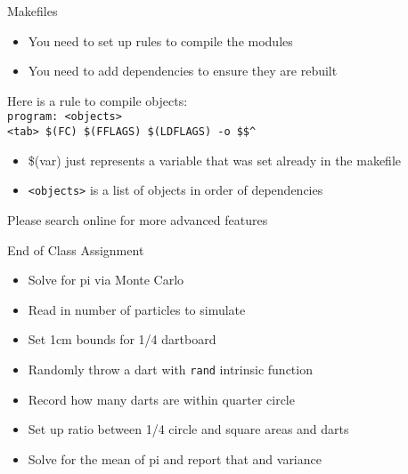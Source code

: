 \documentclass{beamer}
\begin{document}
\begin{frame}{Makefiles}

  \begin{itemize}
    \item You need to set up rules to compile the modules
    \vfill\item You need to add dependencies to ensure they are rebuilt
  \end{itemize}
  \vfill
  Here is a rule to compile objects: \\
  \texttt{program: <objects>} \\
  \texttt{<tab> \$(FC) \$(FFLAGS) \$(LDFLAGS) -o \$\@ \$\^}
  \begin{itemize}
    \vfill\item \$(var) just represents a variable that was set already in the makefile
    \vfill\item \texttt{<objects>} is a list of objects in order of dependencies
  \end{itemize}
  \begin{center}
    \alert{Please search online for more advanced features}
  \end{center}

\end{frame}
\begin{frame}{End of Class Assignment}

  \begin{itemize}
    \item Solve for pi via Monte Carlo
    \vfill\item Read in number of particles to simulate
    \vfill\item Set 1cm bounds for 1/4 dartboard
    \vfill\item Randomly throw a dart with \texttt{rand} intrinsic function
    \vfill\item Record how many darts are within quarter circle
    \vfill\item Set up ratio between 1/4 circle and square areas and darts
    \vfill\item Solve for the mean of pi and report that and variance
  \end{itemize}

\end{frame}
\end{document}
